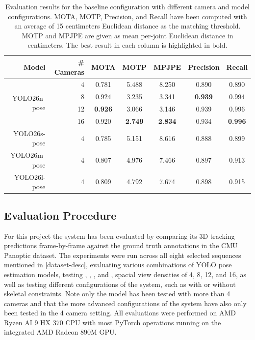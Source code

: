 \begin{table}[!ht]
  \centering
  \begin{tabular}{|r|r|c|c|c|c|c|}
  \hline
    Model & \# Cameras & MOTA & MOTP & MPJPE & Precision & Recall \\ \hline \hline
    \multirow{4}{*}{YOLO26n-pose} & 4 & 0.781 & 5.488 & 8.250 & 0.890 & 0.890 \\ \cline{2-7}
      & 8 & 0.924 & 3.235 & 3.341 & \textbf{0.939} & 0.994 \\ \cline{2-7}
      & 12 & \textbf{0.926} & 3.066 & 3.146 & 0.939 & 0.996 \\ \cline{2-7}
      & 16 & 0.920 & \textbf{2.749} & \textbf{2.834} & 0.934 & \textbf{0.996} \\ \hline \hline
    YOLO26s-pose & 4 & 0.785 & 5.151 & 8.616 & 0.888 & 0.899 \\ \hline
    YOLO26m-pose & 4 & 0.807 & 4.976 & 7.466 & 0.897 & 0.913 \\ \hline
    YOLO26l-pose & 4 & 0.809 & 4.792 & 7.674 & 0.898 & 0.915 \\ \hline
  \end{tabular}
  \caption{Evaluation results for the baseline configuration with different camera and model configurations. MOTA, MOTP, Precision, and Recall have been computed with an average of 15 centimeters Euclidean distance as the matching threshold. MOTP and MPJPE are given as mean per-joint Euclidean distance in centimeters. The best result in each column is highlighted in bold.}
  \label{fig:eval-results}
\end{table}


\subsection{Evaluation Procedure} \label{eval-proc}

For this project the system has been evaluated by comparing its 3D tracking predictions frame-by-frame against the ground truth annotations in the CMU Panoptic dataset. The experiments were run across all eight selected sequences mentioned in \cref{dataset-desc}, evaluating various combinations of YOLO pose estimation models, testing , , , and , spacial view densities of 4, 8, 12, and 16, as well as testing different configurations of the system, such as with or without skeletal constraints. Note only the  model has been tested with more than 4 cameras and that the more advanced configurations of the system have also only been tested in the 4 camera setting. All evaluations were performed on AMD Ryzen AI 9 HX 370 CPU with most PyTorch \parencite{paszke2019pytorch,ansel2024pytorch} operations running on the integrated AMD Radeon 890M GPU.

